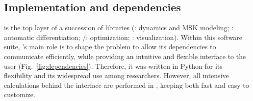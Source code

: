 \subsection{Implementation and dependencies}
\bioptim is the top layer of a succession of libraries (\biorbd: dynamics and MSK modeling; \casadi: automatic differentiation; \ipopt/\acados: optimization; \bioviz: visualization).
Within this software suite, \bioptim 's main role is to shape the problem to allow its dependencies to communicate efficiently, while providing an intuitive and flexible interface to the user (Fig.~\ref{fig:dependencies}).
Therefore, it was written in Python for its flexibility and its widespread use among researchers.
However, all intensive calculations behind the interface are performed in , keeping \bioptim both fast and easy to customize.

